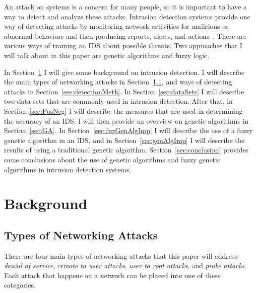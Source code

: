 \documentclass{sig-alternate}
\begin{document}
An attack on systems is a concern for many people, so it is important to have a way to detect and analyze these attacks. Intrusion detection systems provide one way of detecting attacks by monitoring network activities for malicious or abnormal behaviors and then producing reports, alerts, and actions~\cite{DBLP:journals/corr/abs-1204-1336}. There are various ways of training an IDS about possible threats. Two approaches that I will talk about in this paper are genetic algorithms and fuzzy logic.

In Section~\ref{sec:background} I will give some background on intrusion detection. I will describe the main types of networking attacks in Section~\ref{sec:typesAttacks}, and ways of detecting attacks in Section~\ref{sec:detectionMeth}. In Section~\ref{sec:dataSets} I will describe two data sets that are commonly used in intrusion detection. After that,  in Section~\ref{sec:PosNeg} I will describe the measures that are used in determining the accuracy of an IDS. I will then provide an overview on genetic algorithms in Section~\ref{sec:GA}. In Section~\ref{sec:fuzGenAlgImp} I will describe the use of a fuzzy genetic algorithm in an IDS, and in Section~\ref{sec:genAlgImp} I will describe the results of using a traditional genetic algorithm. Section~\ref{sec:conclusion} provides some conclusions about the use of genetic algorithms and fuzzy genetic algorithms in intrusion detection systems.




\section{Background}
\label{sec:background}

\subsection{Types of Networking Attacks}
\label{sec:typesAttacks}
There are four main types of networking attacks that this paper will address: \emph{denial of service}, \emph{remote to user attacks}, \emph{user to root attacks}, and \emph{probe attacks}. Each attack that happens on a network can be placed into one of these categories.~\cite{DBLP:journals/corr/abs-1204-1336}
\end{document}
